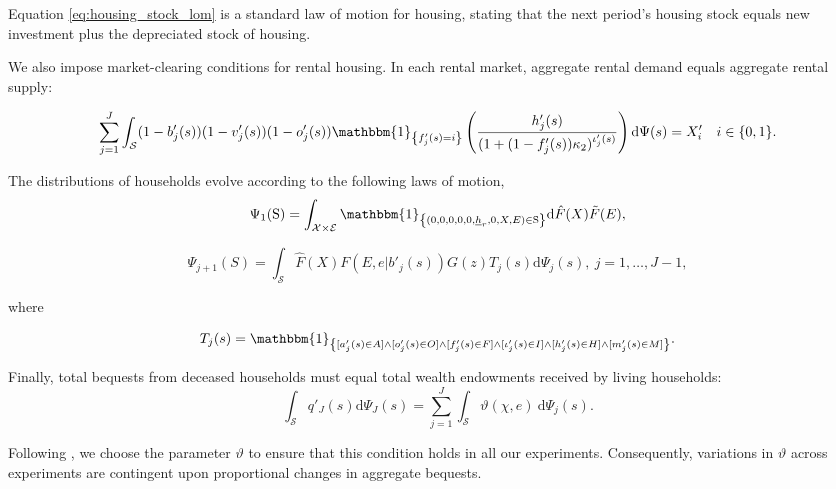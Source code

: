 \documentclass[parskip=full]{article}
\newcommand{\indicator}[1]{\mathbbm{1}_{\left\{ {#1} \right\} }}
\begin{document}
\noindent Equation \eqref{eq:housing_stock_lom} is a standard law of motion for housing, stating that the next period's housing stock equals new investment plus the depreciated stock of housing. 

We also impose market-clearing conditions for rental housing. In each rental market, aggregate rental demand equals aggregate rental supply:

\begin{equation}\label{eq:rental_housing_clearing_condition}
  \sum_{j=1}^J \int_\mathcal{S} (1-b'_{j}(s))(1-v'_{j}(s)) (1-o'_{j}(s))\indicator{f'_{j}(s)=i}\left(\frac{h'_{j}(s)}{(1+(1-f'_{j}(s))\kappa_{2})^{\iota'_{j}(s)}}\right) \mathrm{d}\Psi(s) = X'_{i} \quad i \in \{0,1\}.
\end{equation}

The distributions of households evolve according to the following laws of motion,
\begin{equation}\label{eq:lom1}
\Psi_{1}(\mathrm{S})=\int_{\mathcal{X} \times \mathcal{E}} \indicator{(0,0,0,0,0,\underline{h}_{r},0,X,E)\in \mathrm{S}}\mathrm{d} \hat{F}(X)\tilde{F}(E),
\end{equation}

\begin{equation}\label{eq:lom2}
\Psi_{j+1}(S)=\int_{\mathcal{S}} \hat{F}(X)F(E,e|b'_{j}(s))G(z)T_{j}(s)\mathrm{d}\Psi_{j}(s),\ j=1,\ldots,J-1,
\end{equation}

\noindent where

\begin{align}
    T_{j}(s) = \indicator{[a'_{j}(s)\in A] \land [o'_{j}(s)\in O] \land [f'_{j}(s)\in F] \land [\iota'_{j}(s)\in I] \land [h'_{j}(s) \in H] \land [m'_{j}(s) \in M]}.\notag
\end{align}

Finally, total bequests from deceased households must equal total wealth endowments received by living households:
\begin{equation}\label{market_clearing:agg_bequests}
      \int_{\mathcal{S}} q'_{J}(s) \mathrm{d}\Psi_{J}(s) = \sum_{j=1}^J \int_{\mathcal{S}} \vartheta (\chi,e)\ \mathrm{d}\Psi_j(s).
\end{equation}

\noindent Following \citet{kkk-2021}, we choose the parameter $\vartheta$ to ensure that this condition holds in all our experiments. Consequently, variations in $\vartheta$ across experiments are contingent upon proportional changes in aggregate bequests.
\end{document}
